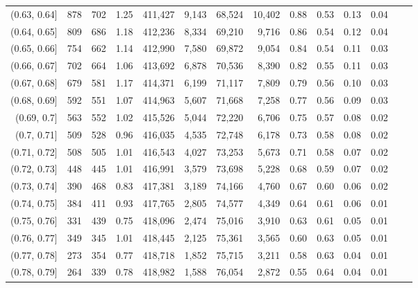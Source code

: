 \begin{tabular}{rrrrrrrrrrrrrr}
(0.63, 0.64]   &     878 &    702 &    1.25 &  411,427 &    9,143 &  68,524 &  10,402 &  0.88 &  0.53 &  0.13 &      0.04 \\
(0.64, 0.65]   &     809 &    686 &    1.18 &  412,236 &    8,334 &  69,210 &   9,716 &  0.86 &  0.54 &  0.12 &      0.04 \\
(0.65, 0.66]   &     754 &    662 &    1.14 &  412,990 &    7,580 &  69,872 &   9,054 &  0.84 &  0.54 &  0.11 &      0.03 \\
(0.66, 0.67]   &     702 &    664 &    1.06 &  413,692 &    6,878 &  70,536 &   8,390 &  0.82 &  0.55 &  0.11 &      0.03 \\
(0.67, 0.68]   &     679 &    581 &    1.17 &  414,371 &    6,199 &  71,117 &   7,809 &  0.79 &  0.56 &  0.10 &      0.03 \\
(0.68, 0.69]   &     592 &    551 &    1.07 &  414,963 &    5,607 &  71,668 &   7,258 &  0.77 &  0.56 &  0.09 &      0.03 \\
(0.69, 0.7]    &     563 &    552 &    1.02 &  415,526 &    5,044 &  72,220 &   6,706 &  0.75 &  0.57 &  0.08 &      0.02 \\
(0.7, 0.71]    &     509 &    528 &    0.96 &  416,035 &    4,535 &  72,748 &   6,178 &  0.73 &  0.58 &  0.08 &      0.02 \\
(0.71, 0.72]   &     508 &    505 &    1.01 &  416,543 &    4,027 &  73,253 &   5,673 &  0.71 &  0.58 &  0.07 &      0.02 \\
(0.72, 0.73]   &     448 &    445 &    1.01 &  416,991 &    3,579 &  73,698 &   5,228 &  0.68 &  0.59 &  0.07 &      0.02 \\
(0.73, 0.74]   &     390 &    468 &    0.83 &  417,381 &    3,189 &  74,166 &   4,760 &  0.67 &  0.60 &  0.06 &      0.02 \\
(0.74, 0.75]   &     384 &    411 &    0.93 &  417,765 &    2,805 &  74,577 &   4,349 &  0.64 &  0.61 &  0.06 &      0.01 \\
(0.75, 0.76]   &     331 &    439 &    0.75 &  418,096 &    2,474 &  75,016 &   3,910 &  0.63 &  0.61 &  0.05 &      0.01 \\
(0.76, 0.77]   &     349 &    345 &    1.01 &  418,445 &    2,125 &  75,361 &   3,565 &  0.60 &  0.63 &  0.05 &      0.01 \\
(0.77, 0.78]   &     273 &    354 &    0.77 &  418,718 &    1,852 &  75,715 &   3,211 &  0.58 &  0.63 &  0.04 &      0.01 \\
(0.78, 0.79]   &     264 &    339 &    0.78 &  418,982 &    1,588 &  76,054 &   2,872 &  0.55 &  0.64 &  0.04 &      0.01 \\

\end{tabular}
